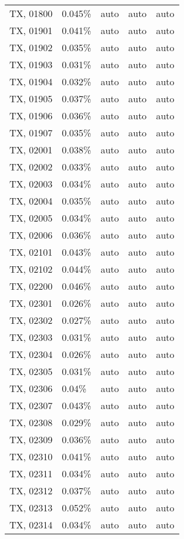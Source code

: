 \begin{longtable}[]{@{}lllll@{}}
TX, 01800 & 0.045\% & auto & auto & auto \\
TX, 01901 & 0.041\% & auto & auto & auto \\
TX, 01902 & 0.035\% & auto & auto & auto \\
TX, 01903 & 0.031\% & auto & auto & auto \\
TX, 01904 & 0.032\% & auto & auto & auto \\
TX, 01905 & 0.037\% & auto & auto & auto \\
TX, 01906 & 0.036\% & auto & auto & auto \\
TX, 01907 & 0.035\% & auto & auto & auto \\
TX, 02001 & 0.038\% & auto & auto & auto \\
TX, 02002 & 0.033\% & auto & auto & auto \\
TX, 02003 & 0.034\% & auto & auto & auto \\
TX, 02004 & 0.035\% & auto & auto & auto \\
TX, 02005 & 0.034\% & auto & auto & auto \\
TX, 02006 & 0.036\% & auto & auto & auto \\
TX, 02101 & 0.043\% & auto & auto & auto \\
TX, 02102 & 0.044\% & auto & auto & auto \\
TX, 02200 & 0.046\% & auto & auto & auto \\
TX, 02301 & 0.026\% & auto & auto & auto \\
TX, 02302 & 0.027\% & auto & auto & auto \\
TX, 02303 & 0.031\% & auto & auto & auto \\
TX, 02304 & 0.026\% & auto & auto & auto \\
TX, 02305 & 0.031\% & auto & auto & auto \\
TX, 02306 & 0.04\% & auto & auto & auto \\
TX, 02307 & 0.043\% & auto & auto & auto \\
TX, 02308 & 0.029\% & auto & auto & auto \\
TX, 02309 & 0.036\% & auto & auto & auto \\
TX, 02310 & 0.041\% & auto & auto & auto \\
TX, 02311 & 0.034\% & auto & auto & auto \\
TX, 02312 & 0.037\% & auto & auto & auto \\
TX, 02313 & 0.052\% & auto & auto & auto \\
TX, 02314 & 0.034\% & auto & auto & auto \\

\end{longtable}

